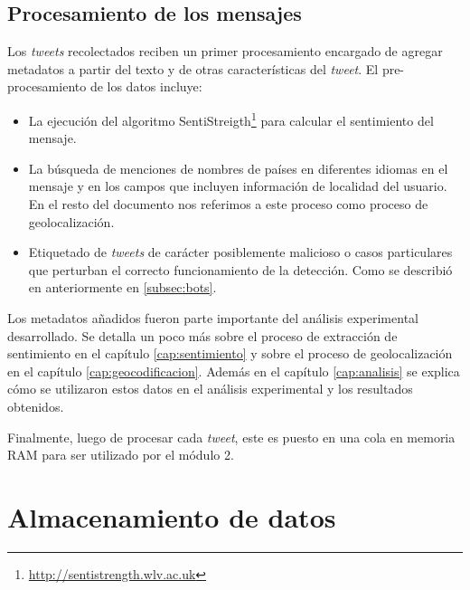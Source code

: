 \subsection{Procesamiento de los mensajes}
Los \textit{tweets} recolectados reciben un primer procesamiento encargado de agregar metadatos a partir del texto y de otras características del \textit{tweet}. El pre-procesamiento de los datos incluye:
\begin{itemize}
\item La ejecución del algoritmo SentiStreigth\footnote{\url{http://sentistrength.wlv.ac.uk}} para calcular el sentimiento del mensaje.
\item La búsqueda de menciones de nombres de países en diferentes idiomas en el mensaje y en los campos que incluyen información de localidad del usuario. En el resto del documento nos referimos a este proceso como proceso de geolocalización.
\item Etiquetado de \textit{tweets} de carácter posiblemente malicioso o casos particulares que perturban el correcto funcionamiento de la detección. Como se describió en anteriormente en \ref{subsec:bots}.%
\end{itemize}

Los metadatos añadidos fueron parte importante del análisis experimental desarrollado. Se detalla un poco más sobre el proceso de extracción de sentimiento en el capítulo \ref{cap:sentimiento} y sobre el proceso de geolocalización en el capítulo \ref{cap:geocodificacion}. Además en el capítulo \ref{cap:analisis} se explica cómo se utilizaron estos datos en el análisis experimental y los resultados obtenidos.

Finalmente, luego de procesar cada \textit{tweet}, este es puesto en una cola en memoria RAM para ser utilizado por el módulo 2.

\section{Almacenamiento de datos}

